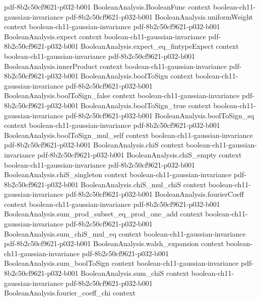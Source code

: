 \begin{lemma}
  {pdf-8b2c50cf9621-p032-b001}
\proofstep
  {BooleanAnalysis.BooleanFunc}
  {context}
  {boolean-ch11-gaussian-invariance}
  {pdf-8b2c50cf9621-p032-b001}
\proofstep
  {BooleanAnalysis.uniformWeight}
  {context}
  {boolean-ch11-gaussian-invariance}
  {pdf-8b2c50cf9621-p032-b001}
\proofstep
  {BooleanAnalysis.expect}
  {context}
  {boolean-ch11-gaussian-invariance}
  {pdf-8b2c50cf9621-p032-b001}
\proofstep
  {BooleanAnalysis.expect_eq_fintypeExpect}
  {context}
  {boolean-ch11-gaussian-invariance}
  {pdf-8b2c50cf9621-p032-b001}
\proofstep
  {BooleanAnalysis.innerProduct}
  {context}
  {boolean-ch11-gaussian-invariance}
  {pdf-8b2c50cf9621-p032-b001}
\proofstep
  {BooleanAnalysis.boolToSign}
  {context}
  {boolean-ch11-gaussian-invariance}
  {pdf-8b2c50cf9621-p032-b001}
\proofstep
  {BooleanAnalysis.boolToSign_false}
  {context}
  {boolean-ch11-gaussian-invariance}
  {pdf-8b2c50cf9621-p032-b001}
\proofstep
  {BooleanAnalysis.boolToSign_true}
  {context}
  {boolean-ch11-gaussian-invariance}
  {pdf-8b2c50cf9621-p032-b001}
\proofstep
  {BooleanAnalysis.boolToSign_sq}
  {context}
  {boolean-ch11-gaussian-invariance}
  {pdf-8b2c50cf9621-p032-b001}
\proofstep
  {BooleanAnalysis.boolToSign_mul_self}
  {context}
  {boolean-ch11-gaussian-invariance}
  {pdf-8b2c50cf9621-p032-b001}
\proofstep
  {BooleanAnalysis.chiS}
  {context}
  {boolean-ch11-gaussian-invariance}
  {pdf-8b2c50cf9621-p032-b001}
\proofstep
  {BooleanAnalysis.chiS_empty}
  {context}
  {boolean-ch11-gaussian-invariance}
  {pdf-8b2c50cf9621-p032-b001}
\proofstep
  {BooleanAnalysis.chiS_singleton}
  {context}
  {boolean-ch11-gaussian-invariance}
  {pdf-8b2c50cf9621-p032-b001}
\proofstep
  {BooleanAnalysis.chiS_mul_chiS}
  {context}
  {boolean-ch11-gaussian-invariance}
  {pdf-8b2c50cf9621-p032-b001}
\proofstep
  {BooleanAnalysis.fourierCoeff}
  {context}
  {boolean-ch11-gaussian-invariance}
  {pdf-8b2c50cf9621-p032-b001}
\proofstep
  {BooleanAnalysis.sum_prod_subset_eq_prod_one_add}
  {context}
  {boolean-ch11-gaussian-invariance}
  {pdf-8b2c50cf9621-p032-b001}
\proofstep
  {BooleanAnalysis.sum_chiS_mul_eq}
  {context}
  {boolean-ch11-gaussian-invariance}
  {pdf-8b2c50cf9621-p032-b001}
\proofstep
  {BooleanAnalysis.walsh_expansion}
  {context}
  {boolean-ch11-gaussian-invariance}
  {pdf-8b2c50cf9621-p032-b001}
\proofstep
  {BooleanAnalysis.sum_boolToSign}
  {context}
  {boolean-ch11-gaussian-invariance}
  {pdf-8b2c50cf9621-p032-b001}
\proofstep
  {BooleanAnalysis.sum_chiS}
  {context}
  {boolean-ch11-gaussian-invariance}
  {pdf-8b2c50cf9621-p032-b001}
\proofstep
  {BooleanAnalysis.fourier_coeff_chi}
  {context}

\end{lemma}
